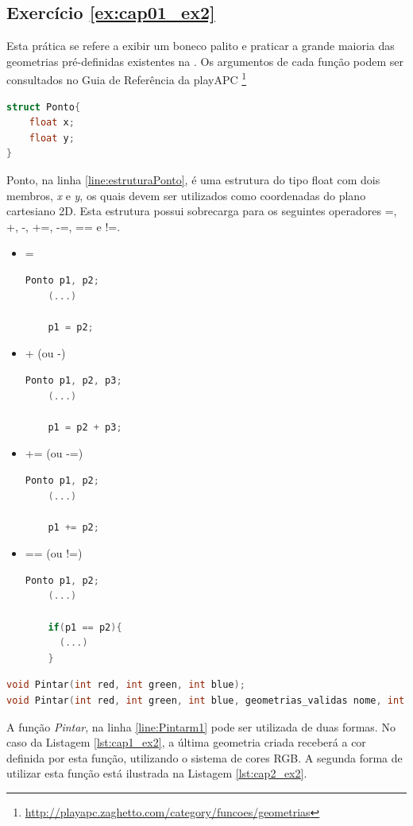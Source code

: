 \subsection*{Exercício \ref{ex:cap01_ex2}}

Esta prática se refere a exibir um boneco palito e praticar a grande maioria das geometrias pré-definidas existentes na \playAPC{}. Os argumentos de cada função podem ser consultados no Guia de Referência da playAPC{} \footnote{\url{http://playapc.zaghetto.com/category/funcoes/geometrias}}


\begin{lstlisting}[label={func:Ponto},language=C++]
struct Ponto{
    float x;
    float y;
}
\end{lstlisting}
Ponto, na linha \ref{line:estruturaPonto}, é uma estrutura do tipo float com dois membros, \emph{x} e \emph{y}, os quais devem ser utilizados como coordenadas do plano cartesiano 2D. Esta estrutura possui sobrecarga para os seguintes operadores =, +, -, +=, -=, == e !=.
\begin{itemize}
  \item =
    \begin{lstlisting}[style=customc,language=C++]
    Ponto p1, p2;
    (...)

    p1 = p2;
    \end{lstlisting}
   \item + (ou -)
    \begin{lstlisting}[style=customc,language=C++]
    Ponto p1, p2, p3;
    (...)

    p1 = p2 + p3;
    \end{lstlisting} 
     \item += (ou -=)
    \begin{lstlisting}[style=customc,language=C++]
    Ponto p1, p2;
    (...)

    p1 += p2;
    \end{lstlisting}

     \item == (ou !=)
    \begin{lstlisting}[style=customc,language=C++]
    Ponto p1, p2;
    (...)

    if(p1 == p2){
      (...)
    }
    \end{lstlisting}
\end{itemize}

\begin{lstlisting}[label={func:Pintarm1},language=C++]
void Pintar(int red, int green, int blue); 
void Pintar(int red, int green, int blue, geometrias_validas nome, int index);
\end{lstlisting}
A função \emph{Pintar}, na linha \ref{line:Pintarm1} pode ser utilizada de duas formas. No caso da Listagem \ref{lst:cap1_ex2}, a última geometria criada receberá a cor definida por esta função, utilizando o sistema de cores RGB. A segunda forma de utilizar esta função está ilustrada na Listagem \ref{lst:cap2_ex2}.

